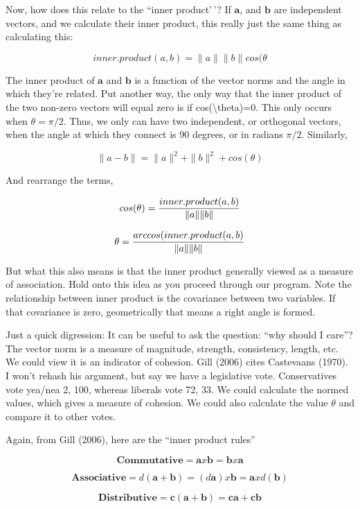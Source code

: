 \documentclass[
]{book}
\begin{document}
Now, how does this relate to the ``inner product'\,'? If \(\textbf{a}\),
and \(\textbf{b}\) are independent vectors, and we calculate their inner
product, this really just the same thing as calculating this:

\[inner.product(a,b)=\|a\|\|b\|cos(\theta\]

The inner product of \(\textbf{a}\) and \(\textbf{b}\) is a function of
the vector norms and the angle in which they're related. Put another
way, the only way that the inner product of the two non-zero vectors
will equal zero is if cos(\textbackslash theta)=0. This only occurs when
\(\theta=\pi/2\). Thus, we only can have two independent, or orthogonal
vectors, when the angle at which they connect is 90 degrees, or in
radians \(\pi/2\). Similarly,

\[\|a-b\|=\|a\|^2+\|b\|^2+cos(\theta)\]

And rearrange the terms,

\[cos(\theta)={{inner.product(a,b)}\over {\|a\|\|b\|}}\]

\[\theta={{arccos(inner.product(a,b)}\over{\|a\|\|b\|}}\]

But what this also means is that the inner product generally viewed as a
measure of association. Hold onto this idea as you proceed through our
program. Note the relationship between inner product is the covariance
between two variables. If that covariance is zero, geometrically that
means a right angle is formed.

Just a quick digression: It can be useful to ask the question: ``why
should I care''? The vector norm is a measure of magnitude, strength,
consistency, length, etc. We could view it is an indicator of cohesion.
Gill (2006) cites Castevaans (1970). I won't rehash his argument, but
say we have a legislative vote. Conservatives vote yea/nea 2, 100,
whereas liberals vote 72, 33. We could calculate the normed values,
which gives a measure of cohesion. We could also calculate the value
\(\theta\) and compare it to other votes.

Again, from Gill (2006), here are the ``inner product rules''

\[\textbf{Commutative}=\textbf{a} x \textbf{b}=\textbf{b} x \textbf{a}\]

\[\textbf{Associative}=d(\textbf{a}+\textbf{b})=(d\textbf{a}) x \textbf{b}=\textbf{a} x d(\textbf{b})\]

\[\textbf{Distributive}=\textbf{c}(\textbf{a}+\textbf{b})=\textbf{c}\textbf{a}+\textbf{c}\textbf{b}\]
\end{document}
